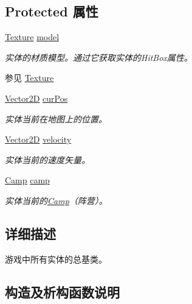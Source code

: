 \subsection*{Protected 属性}
\begin{DoxyCompactItemize}
\item 
\hyperlink{struct_texture}{Texture} \hyperlink{class_entity_a22ccba8fb86e5b4e10b2c33b6f56d238}{model}
\begin{DoxyCompactList}\small\item\em 实体的材质模型。通过它获取实体的\+Hit\+Box属性。\begin{DoxySeeAlso}{参见}
\hyperlink{struct_texture}{Texture}


\end{DoxySeeAlso}
\end{DoxyCompactList}\item 
\hyperlink{_vector2_d_8hpp_aa1f1145650f1dd9bddf7335ec6434d7c}{Vector2D} \hyperlink{class_entity_a5031aa6b058f2231daad16b35e3d536d}{cur\+Pos}
\begin{DoxyCompactList}\small\item\em 实体当前在地图上的位置。 \end{DoxyCompactList}\item 
\hyperlink{_vector2_d_8hpp_aa1f1145650f1dd9bddf7335ec6434d7c}{Vector2D} \hyperlink{class_entity_a386d25b56772b8913eb3e5adc636f6e0}{velocity}
\begin{DoxyCompactList}\small\item\em 实体当前的速度矢量。 \end{DoxyCompactList}\item 
\hyperlink{_entity_8h_ad54c4fe39f1c51b786c24ae0b7763b44}{Camp} \hyperlink{class_entity_a5326accd49d3817310ec90692b9da3df}{camp}
\begin{DoxyCompactList}\small\item\em 实体当前的\hyperlink{_entity_8h_ad54c4fe39f1c51b786c24ae0b7763b44}{Camp}（阵营）。 \end{DoxyCompactList}\end{DoxyCompactItemize}


\subsection{详细描述}
游戏中所有实体的总基类。 



\subsection{构造及析构函数说明}
\mbox{\label{class_entity_a604327e36e9783d29dd6ae6e4626777a}} 

